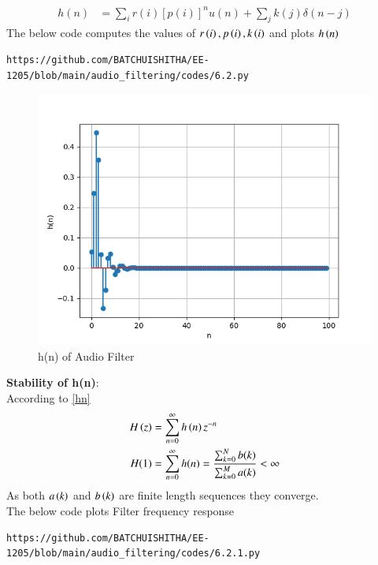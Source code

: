 \documentclass[journal,12pt,twocolumn]{IEEEtran}
\theoremstyle{remark}
\begin{document}
\begin{enumerate}[label=\thesection.\arabic*]
\begin{align}
h(n) &= \sum_{i}r(i)[p(i)]^nu(n) + \sum_{j}k(j)\delta(n - j)
	\label{eq:7.2.4}
\end{align}
The below code computes the values of $r\left(i\right),p\left(i\right) , k\left(i\right)$ and plots $h\left(n\right)$
\begin{lstlisting}
https://github.com/BATCHUISHITHA/EE-1205/blob/main/audio_filtering/codes/6.2.py
\end{lstlisting}

\begin{figure}[ht]
\centering
\includegraphics[width=1\columnwidth]{figs/6.2.png}
\caption{h(n) of Audio Filter}
\label{fig:6.2}
\end{figure}
\textbf{Stability of h(n)}:\\
According to \eqref{hn}
\begin{align}
H\left(z\right) &= \sum_{n = 0}^{\infty} h\left(n\right)z^{-n}\\
H(1)&= \sum_{n = 0}^{\infty}h(n)  = \frac{\sum_{k = 0}^{N}b(k)}{\sum_{k = 0}^{M}a(k)}< \infty
\end{align}
As both $a\left(k\right)$ and $b\left(k\right)$ are finite length sequences they converge.\\
The below code plots Filter frequency response
\begin{lstlisting}
https://github.com/BATCHUISHITHA/EE-1205/blob/main/audio_filtering/codes/6.2.1.py
\end{lstlisting}
\begin{figure}[ht]
\centering

\end{figure}
\end{enumerate}
\end{document}
